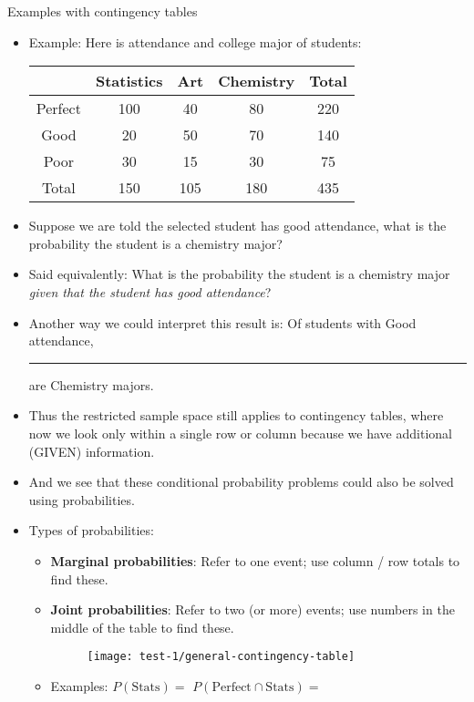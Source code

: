 \documentclass{article}
\newcommand{\blankul}[1]{\rule[-1.5mm]{#1}{0.15mm}}	%
\begin{document}
Examples with contingency tables\bigskip
\begin{itemize}
    \item Example: Here is attendance and college major of students:
    \begin{center}
        \begin{tabular}{| c | c | c | c || c |}
        \hline
         & Statistics & Art & Chemistry & Total\\
        \hline
        Perfect & 100 & 40 & 80 & 220\\
        \hline
        Good & 20 & 50 & 70 & 140\\
        \hline
        Poor & 30 & 15 & 30 & 75\\
        \hline\hline
        Total & 150 & 105 & 180 & 435\\
        \hline
        \end{tabular}%
    \end{center}\bigskip
    \item Suppose we are told the selected student has good attendance, what is the probability the student is a chemistry major?\\
    \item[] Said equivalently: What is the probability the student is a chemistry major \textit{given that the student has good attendance}?\vspace{100pt}
    \item[] Another way we could interpret this result is: Of students with Good attendance, \blankul{1.5cm} are Chemistry majors.\\
    \item Thus the restricted sample space still applies to contingency tables, where now we look only within a single row or column because we have additional (GIVEN) information.
    \item[] And we see that these conditional probability problems could also be solved using probabilities.\bigskip
    \item Types of probabilities:
    \begin{itemize}
        \item \textbf{Marginal probabilities}: Refer to one event; use column / row totals to find these.
        \item \textbf{Joint probabilities}: Refer to two (or more) events; use numbers in the middle of the table to find these.
        \begin{figure}[H]
            \center\texttt{[image: test-1/general-contingency-table]}
        \end{figure}
        \item Examples: $P(\text{Stats}) = $\hspace{100pt} $P(\text{Perfect} \cap\text{Stats}) = $
    \end{itemize}
\end{itemize}\bigskip
\end{document}
